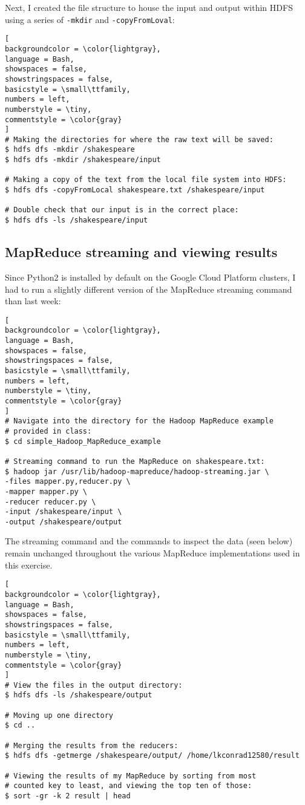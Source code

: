 \documentclass[]{article}
\newcommand{\code}[1]{\colorbox{light-gray}{\texttt{#1}}}
\begin{document}
Next, I created the file structure to house the input and output within HDFS using a series of \code{-mkdir} and \code{-copyFromLoval}:

\begin{lstlisting}[
backgroundcolor = \color{lightgray},
language = Bash,
showspaces = false,
showstringspaces = false,
basicstyle = \small\ttfamily,
numbers = left,
numberstyle = \tiny,
commentstyle = \color{gray}
]
# Making the directories for where the raw text will be saved:
$ hdfs dfs -mkdir /shakespeare
$ hdfs dfs -mkdir /shakespeare/input

# Making a copy of the text from the local file system into HDFS:
$ hdfs dfs -copyFromLocal shakespeare.txt /shakespeare/input

# Double check that our input is in the correct place:
$ hdfs dfs -ls /shakespeare/input
\end{lstlisting}

\subsection{MapReduce streaming and viewing results}
Since Python2 is installed by default on the Google Cloud Platform clusters, I had to run a slightly different version of the MapReduce streaming command than last week:

\begin{lstlisting}[
backgroundcolor = \color{lightgray},
language = Bash,
showspaces = false,
showstringspaces = false,
basicstyle = \small\ttfamily,
numbers = left,
numberstyle = \tiny,
commentstyle = \color{gray}
]
# Navigate into the directory for the Hadoop MapReduce example
# provided in class:
$ cd simple_Hadoop_MapReduce_example

# Streaming command to run the MapReduce on shakespeare.txt:
$ hadoop jar /usr/lib/hadoop-mapreduce/hadoop-streaming.jar \
-files mapper.py,reducer.py \
-mapper mapper.py \
-reducer reducer.py \
-input /shakespeare/input \
-output /shakespeare/output
\end{lstlisting}

The streaming command and the commands to inspect the data (seen below) remain unchanged throughout the various MapReduce implementations used in this exercise.

\begin{lstlisting}[
backgroundcolor = \color{lightgray},
language = Bash,
showspaces = false,
showstringspaces = false,
basicstyle = \small\ttfamily,
numbers = left,
numberstyle = \tiny,
commentstyle = \color{gray}
]
# View the files in the output directory:
$ hdfs dfs -ls /shakespeare/output

# Moving up one directory
$ cd ..

# Merging the results from the reducers:
$ hdfs dfs -getmerge /shakespeare/output/ /home/lkconrad12580/result

# Viewing the results of my MapReduce by sorting from most 
# counted key to least, and viewing the top ten of those:
$ sort -gr -k 2 result | head
\end{lstlisting}
\end{document}
